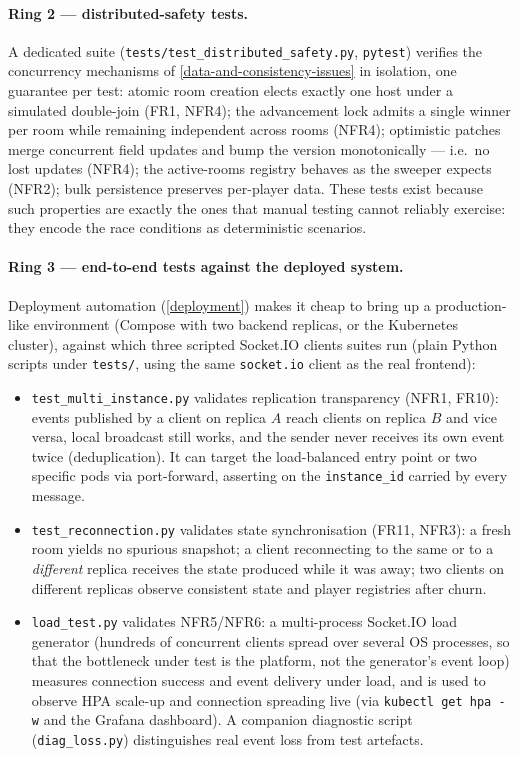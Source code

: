 \documentclass{scrartcl}
\begin{document}
\paragraph{Ring 2 --- distributed-safety tests.}
A dedicated suite (\texttt{tests/test\_distributed\_safety.py},
\texttt{pytest}) verifies the concurrency mechanisms of
\cref{data-and-consistency-issues} in isolation, one guarantee per test:
atomic room creation elects exactly one host under a simulated
double-join (FR1, NFR4); the advancement lock admits a single winner per
room while remaining independent across rooms (NFR4); optimistic patches
merge concurrent field updates and bump the version monotonically ---
i.e.\ no lost updates (NFR4); the active-rooms registry behaves as the
sweeper expects (NFR2); bulk persistence preserves per-player data.
These tests exist because such properties are exactly the ones that
manual testing cannot reliably exercise: they encode the race conditions
as deterministic scenarios.

\paragraph{Ring 3 --- end-to-end tests against the deployed system.}
Deployment automation (\cref{deployment}) makes it cheap to bring up a
production-like environment (Compose with two backend replicas, or the
Kubernetes cluster), against which three scripted Socket.IO clients
suites run (plain Python scripts under \texttt{tests/}, using the same
\texttt{socket.io} client as the real frontend):

\begin{itemize}
  \item \texttt{test\_multi\_instance.py} validates replication
  transparency (NFR1, FR10): events published by a client on replica $A$
  reach clients on replica $B$ and vice versa, local broadcast still
  works, and the sender never receives its own event twice
  (deduplication). It can target the load-balanced entry point or two
  specific pods via port-forward, asserting on the \texttt{instance\_id}
  carried by every message.

  \item \texttt{test\_reconnection.py} validates state synchronisation
  (FR11, NFR3): a fresh room yields no spurious snapshot; a client
  reconnecting to the same or to a \emph{different} replica receives the
  state produced while it was away; two clients on different replicas
  observe consistent state and player registries after churn.

  \item \texttt{load\_test.py} validates NFR5/NFR6: a multi-process
  Socket.IO load generator (hundreds of concurrent clients spread over
  several OS processes, so that the bottleneck under test is the
  platform, not the generator's event loop) measures connection success
  and event delivery under load, and is used to observe HPA scale-up and
  connection spreading live (via \texttt{kubectl get hpa -w} and the
  Grafana dashboard). A companion diagnostic script
  (\texttt{diag\_loss.py}) distinguishes real event loss from test
  artefacts.
\end{itemize}
\end{document}

